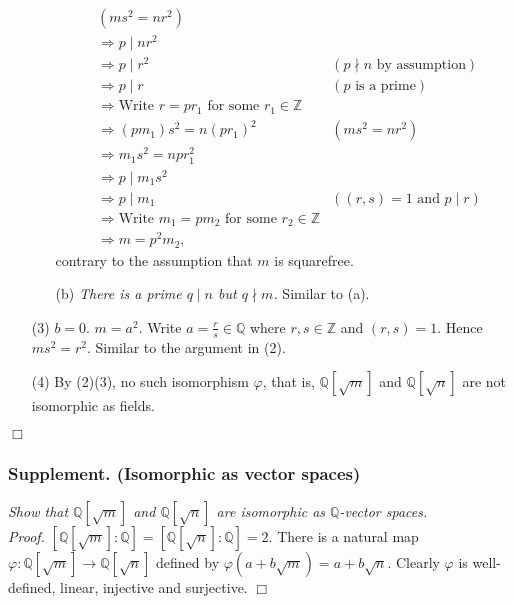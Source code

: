\documentclass{article}
\begin{document}
\begin{enumerate}
\begin{enumerate}
\begin{align*}
    &(ms^2 = nr^2) \\
  &\Longrightarrow
  p \mid nr^2 \\
  &\Longrightarrow
  p \mid r^2
    &(\text{$p \nmid n$ by assumption}) \\
  &\Longrightarrow
  p \mid r
    &(\text{$p$ is a prime}) \\
  &\Longrightarrow
  \text{Write $r = pr_1$ for some $r_1 \in \mathbb{Z}$} \\
  &\Longrightarrow
  (pm_1)s^2 = n(pr_1)^2
    &(ms^2 = nr^2) \\
  &\Longrightarrow
  m_1s^2 = npr_1^2 \\
  &\Longrightarrow
  p \mid m_1s^2 \\
  &\Longrightarrow
  p \mid m_1
    &(\text{$(r,s)=1$ and $p \mid r$}) \\
  &\Longrightarrow
  \text{Write $m_1 = pm_2$ for some $r_2 \in \mathbb{Z}$} \\
  &\Longrightarrow
  m = p^2m_2,
  \end{align*}
  contrary to the assumption that $m$ is squarefree.
  \item[(b)]
  \emph{There is a prime $q \mid n$ but $q \nmid m$.}
  Similar to (a).
  \end{enumerate}
\item[(3)]
$b = 0$.
$m = a^2$.
Write $a = \frac{r}{s} \in \mathbb{Q}$ where $r, s \in \mathbb{Z}$ and $(r, s) = 1$.
Hence $ms^2 = r^2$.
Similar to the argument in (2).
\item[(4)]
By (2)(3), no such isomorphism $\varphi$, that is,
$\mathbb{Q}[\sqrt{m}]$ and $\mathbb{Q}[\sqrt{n}]$
are not isomorphic as fields.
\end{enumerate}
$\Box$ \\



\subsubsection*{Supplement. (Isomorphic as vector spaces)}
\emph{Show that $\mathbb{Q}[\sqrt{m}]$ and $\mathbb{Q}[\sqrt{n}]$
are isomorphic as $\mathbb{Q}$-vector spaces.} \\



\emph{Proof.}
$[\mathbb{Q}[\sqrt{m}]:\mathbb{Q}] = [\mathbb{Q}[\sqrt{n}]:\mathbb{Q}] = 2$.
There is a natural map $\varphi: \mathbb{Q}[\sqrt{m}] \to \mathbb{Q}[\sqrt{n}]$
defined by $\varphi(a + b\sqrt{m}) = a + b\sqrt{n}$.
Clearly $\varphi$ is well-defined, linear, injective and surjective.
$\Box$ \\\\
\end{document}
